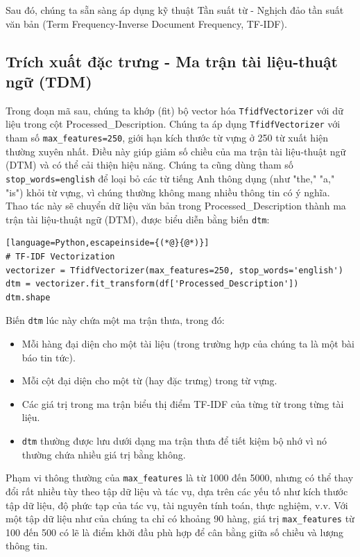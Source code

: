 Sau đó, chúng ta sẵn sàng áp dụng kỹ thuật Tần suất từ - Nghịch đảo tần suất văn bản (Term Frequency-Inverse Document Frequency, TF-IDF).

\subsection{Trích xuất đặc trưng - Ma trận tài liệu-thuật ngữ (TDM)}

Trong đoạn mã sau, chúng ta khớp (fit) bộ vector hóa \texttt{TfidfVectorizer} với dữ liệu trong cột \textquotesingle Processed\_Description\textquotesingle. Chúng ta áp dụng \texttt{TfidfVectorizer} với tham số \texttt{max\_features=250}, giới hạn kích thước từ vựng ở 250 từ xuất hiện thường xuyên nhất. Điều này giúp giảm số chiều của ma trận tài liệu-thuật ngữ (DTM) và có thể cải thiện hiệu năng. Chúng ta cũng dùng tham số \texttt{stop\_words=\textquotesingle{}english\textquotesingle{}} để loại bỏ các từ tiếng Anh thông dụng (như "the," "a," "is") khỏi từ vựng, vì chúng thường không mang nhiều thông tin có ý nghĩa. Thao tác này sẽ chuyển dữ liệu văn bản trong \textquotesingle Processed\_Description\textquotesingle{} thành ma trận tài liệu-thuật ngữ (DTM), được biểu diễn bằng biến \texttt{dtm}:

\begin{lstlisting}[language=Python,escapeinside={(*@}{@*)}]
# TF-IDF Vectorization
vectorizer = TfidfVectorizer(max_features=250, stop_words='english')
dtm = vectorizer.fit_transform(df['Processed_Description'])
dtm.shape
\end{lstlisting}

Biến \texttt{dtm} lúc này chứa một ma trận thưa, trong đó:

\begin{itemize}
\item
  Mỗi hàng đại diện cho một tài liệu (trong trường hợp của chúng ta là một bài báo tin tức).
\item
  Mỗi cột đại diện cho một từ (hay đặc trưng) trong từ vựng.
\item
  Các giá trị trong ma trận biểu thị điểm TF-IDF của từng từ trong từng tài liệu.
\item
  \texttt{dtm} thường được lưu dưới dạng ma trận thưa để tiết kiệm bộ nhớ vì nó thường chứa nhiều giá trị bằng không.
\end{itemize}

Phạm vi thông thường của \texttt{max\_features} là từ 1000 đến 5000, nhưng có thể thay đổi rất nhiều tùy theo tập dữ liệu và tác vụ, dựa trên các yếu tố như kích thước tập dữ liệu, độ phức tạp của tác vụ, tài nguyên tính toán, thực nghiệm, v.v. Với một tập dữ liệu như của chúng ta chỉ có khoảng 90 hàng, giá trị \texttt{max\_features} từ 100 đến 500 có lẽ là điểm khởi đầu phù hợp để cân bằng giữa số chiều và lượng thông tin.

